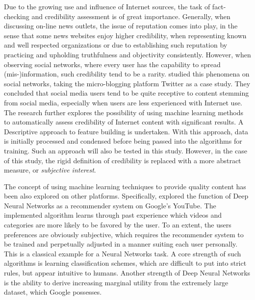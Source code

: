 		\par
		
		Due to the growing use and influence of Internet sources, the task of fact-checking and credibility assessment is of great importance. Generally, when discussing on-line news outlets, the issue of reputation comes into play, in the sense that some news websites enjoy higher credibility, when representing known and well respected organizations or due to establishing such reputation by practicing and upholding truthfulness and objectivity consistently. However, when observing social networks, where every user has the capability to spread (mis-)information, such credibility tend to be a rarity. \cite*{castillo2011information} studied this phenomena on social networks, taking the micro-blogging platform Twitter as a case study. They concluded that social media users tend to be quite receptive to content stemming from social media, especially when users are less experienced with Internet use. The research further explores the possibility of using machine learning methods to automatically assess credibility of Internet content with significant results. A Descriptive approach to feature building is undertaken. With this approach, data is initially processed and condensed before being passed into the algorithms for training. Such an approach will also be tested in this study. However, in the case of this study, the rigid definition of credibility is replaced with a more abstract measure, or \textit{subjective interest}.
		
		\par
		
		The concept of using machine learning techniques to provide quality content has been also explored on other platforms. Specifically, \cite*{covington2016deep} explored the function of Deep Neural Networks as a recommender system on Google's YouTube. The implemented algorithm learns through past experience which videos and categories are more likely to be favored by the user. To an extent, the users preferences are obviously subjective, which requires the recommender system to be trained and perpetually adjusted in a manner suiting each user personally. This is a classical example for a Neural Networks task. A core strength of such algorithms is learning classification schemes, which are difficult to put into strict rules, but appear intuitive to humans. Another strength of Deep Neural Networks is the ability to derive increasing marginal utility from the extremely large dataset, which Google possesses.
		
